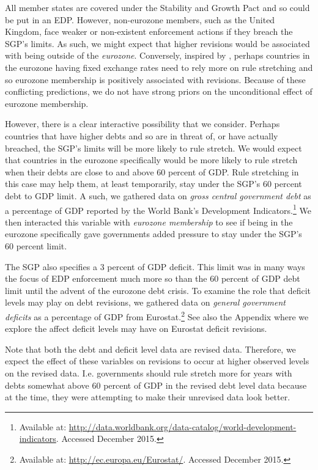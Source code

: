 \documentclass[]{article}
\begin{document}
All member states are covered under the Stability and Growth Pact and so could be put in an EDP. However, non-eurozone members, such as the United Kingdom, face weaker or non-existent enforcement actions if they breach the SGP's limits. As such, we might expect that higher revisions would be associated with being outside of the \emph{eurozone}. Conversely, inspired by \cite{clark2003}, perhaps countries in the eurozone having fixed exchange rates need to rely more on rule stretching and so eurozone membership is positively associated with revisions. Because of these conflicting predictions, we do not have strong priors on the unconditional effect of eurozone membership.

However, there is a clear interactive possibility that we consider. Perhaps countries that have higher debts and so are in threat of, or have actually breached, the SGP's limits will be more likely to rule stretch. We would expect that countries in the eurozone specifically would be more likely to rule stretch when their debts are close to and above 60 percent of GDP. Rule stretching in this case may help them, at least temporarily, stay under the SGP's 60 percent debt to GDP limit. A such, we gathered data on \emph{gross central government debt} as a percentage of GDP reported by the World Bank's Development Indicators.\footnote{Available at: \url{http://data.worldbank.org/data-catalog/world-development-indicators}. Accessed December 2015.} We then interacted this variable with \emph{eurozone membership} to see if being in the eurozone specifically gave governments added pressure to stay under the SGP's 60 percent limit.

The SGP also specifies a 3 percent of GDP deficit. This limit was in many ways the focus of EDP enforcement much more so than the 60 percent of GDP debt limit until the advent of the eurozone debt crisis. To examine the role that deficit levels may play on debt revisions, we gathered data on \emph{general government deficits} as a percentage of GDP from Eurostat.\footnote{Available at: \url{http://ec.europa.eu/Eurostat/}. Accessed December 2015.} See also the Appendix where we explore the affect deficit levels may have on Eurostat deficit revisions.

Note that both the debt and deficit level data are revised data. Therefore, we expect the effect of these variables on revisions to occur at higher observed levels on the revised data. I.e. governments should rule stretch more for years with debts somewhat above 60 percent of GDP in the revised debt level data because at the time, they were attempting to make their unrevised data look better.
\end{document}
